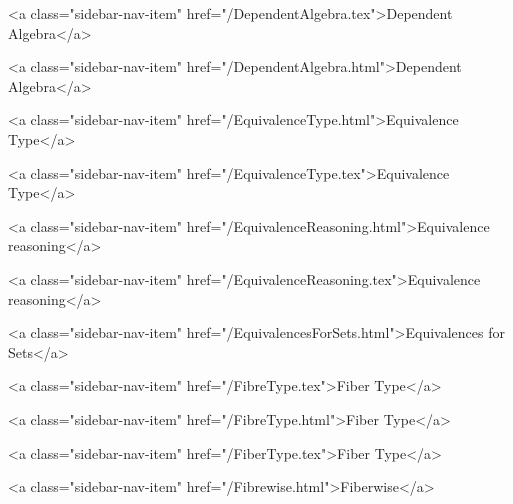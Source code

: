       
    
      
        
          <a class="sidebar-nav-item" href="/DependentAlgebra.tex">Dependent Algebra</a>
        
      
    
      
        
          <a class="sidebar-nav-item" href="/DependentAlgebra.html">Dependent Algebra</a>
        
      
    
      
        
          <a class="sidebar-nav-item" href="/EquivalenceType.html">Equivalence Type</a>
        
      
    
      
        
          <a class="sidebar-nav-item" href="/EquivalenceType.tex">Equivalence Type</a>
        
      
    
      
        
          <a class="sidebar-nav-item" href="/EquivalenceReasoning.html">Equivalence reasoning</a>
        
      
    
      
        
          <a class="sidebar-nav-item" href="/EquivalenceReasoning.tex">Equivalence reasoning</a>
        
      
    
      
        
          <a class="sidebar-nav-item" href="/EquivalencesForSets.html">Equivalences for Sets</a>
        
      
    
      
        
          <a class="sidebar-nav-item" href="/FibreType.tex">Fiber Type</a>
        
      
    
      
        
          <a class="sidebar-nav-item" href="/FibreType.html">Fiber Type</a>
        
      
    
      
        
          <a class="sidebar-nav-item" href="/FiberType.tex">Fiber Type</a>
        
      
    
      
        
          <a class="sidebar-nav-item" href="/Fibrewise.html">Fiberwise</a>
        
